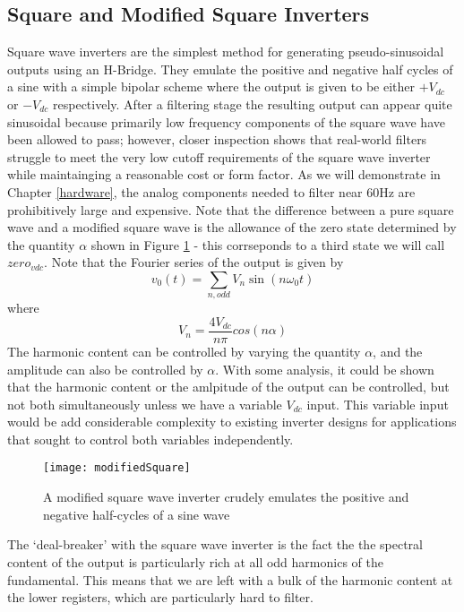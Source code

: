 \subsection{Square and Modified Square Inverters}
\label{squareApproach}
Square wave inverters are the simplest method for generating pseudo-sinusoidal outputs using an H-Bridge. They emulate the positive and negative half cycles of a sine with a simple bipolar scheme where the output is given to be either $+V_{dc}$ or $-V_{dc}$ respectively. After a filtering stage the resulting output can appear quite sinusoidal because primarily low frequency components of the square wave have been allowed to pass; however, closer inspection shows that real-world filters struggle to meet the very low cutoff requirements of the square wave inverter while maintainging a reasonable cost or form factor. As we will demonstrate in Chapter \ref{hardware}, the analog components needed to filter near 60Hz are prohibitively large and expensive. Note that the difference between a pure square wave and a modified square wave is the allowance of the zero state determined by the quantity $\alpha$ shown in Figure \ref{modifiedSquare} - this corrseponds to a third state we will call $zero_{vdc}$. Note that the Fourier series of the output is given by 
\begin{equation}
v_0(t)=\sum\limits_{n,odd}V_n\sin{(n\omega_0t)}
\end{equation}
where 
\begin{equation}
V_n=\frac{4V_{dc}}{n\pi}cos{(n\alpha)}
\end{equation}
The harmonic content can be controlled by varying the quantity $\alpha$, and the amplitude can also be controlled by $\alpha$. With some analysis, it could be shown that the harmonic content or the amlpitude of the output can be controlled, but not both simultaneously unless we have a variable $V_{dc}$ input. This variable input would be add considerable complexity to existing inverter designs for applications that sought to control both variables independently.

\begin{figure}[h]
\centering
\texttt{[image: modifiedSquare]}
\caption{A modified square wave inverter crudely emulates the positive and negative half-cycles of a sine wave \cite{inverterFourier}}
\label{modifiedSquare}
\end{figure}

The `deal-breaker' with the square wave inverter is the fact the the spectral content of the output is particularly rich at all odd harmonics of the fundamental. This means that we are left with a bulk of the harmonic content at the lower registers, which are particularly hard to filter. 

